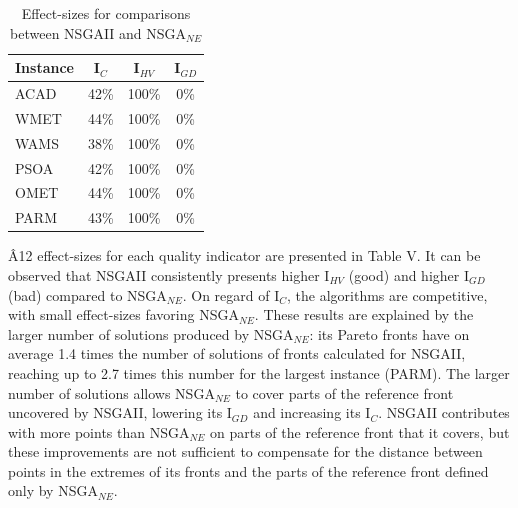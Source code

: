 \documentclass[conference]{IEEEtran}
\begin{document}
\begin{table}[htbp]
  \scriptsize
	\centering
  \caption{Effect-sizes for comparisons between NSGAII and NSGA$_{NE}$}
    \begin{tabular}{lccc}
    \toprule
    \textbf{Instance} & \textbf{I$_{C}$} & \textbf{I$_{HV}$} & \textbf{I$_{GD}$} \\
    \midrule
    ACAD  &  42\%  & 100\% &   0\% \\
    WMET  &  44\%  & 100\% &   0\% \\
    WAMS  &  38\%  & 100\% &   0\% \\
    PSOA  &  42\%  & 100\% &   0\% \\
    OMET  &  44\%  & 100\% &   0\% \\
    PARM  &  43\%  & 100\% &   0\% \\
    \bottomrule
    \end{tabular}%
\end{table}%

{\^A12} effect-sizes for each quality indicator are presented in Table V. It can be observed that NSGAII consistently presents higher I$_{HV}$ (good) and higher I$_{GD}$ (bad) compared to NSGA$_{NE}$. On regard of I$_{C}$, the algorithms are competitive, with small effect-sizes favoring NSGA$_{NE}$. These results are explained by the larger number of solutions produced by NSGA$_{NE}$: its Pareto fronts have on average 1.4 times the number of solutions of fronts calculated for NSGAII, reaching up to 2.7 times this number for the largest instance (PARM). The larger number of solutions allows NSGA$_{NE}$ to cover parts of the reference front uncovered by NSGAII, lowering its I$_{GD}$ and increasing its I$_{C}$. NSGAII contributes with more points than NSGA$_{NE}$ on parts of the reference front that it covers, but these improvements are not sufficient to compensate for the distance between points in the extremes of its fronts and the parts of the reference front defined only by NSGA$_{NE}$.
\end{document}
